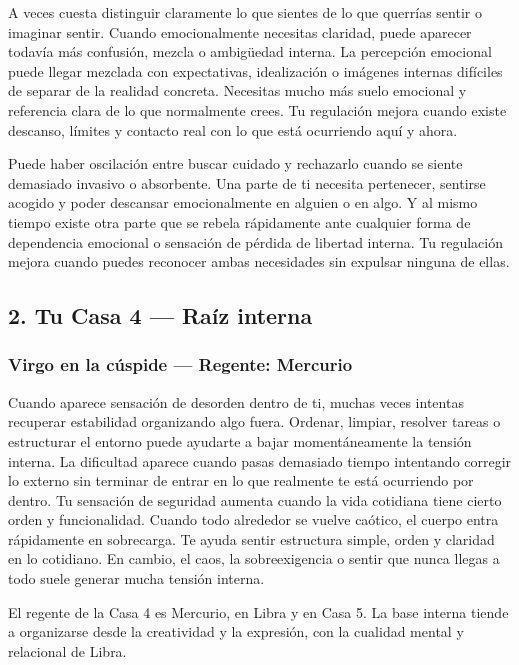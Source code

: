 \documentclass[11pt,a4paper]{article}
\begin{document}
A veces cuesta distinguir claramente lo que sientes de lo que querrías sentir o imaginar sentir. Cuando emocionalmente necesitas claridad, puede aparecer todavía más confusión, mezcla o ambigüedad interna. La percepción emocional puede llegar mezclada con expectativas, idealización o imágenes internas difíciles de separar de la realidad concreta. Necesitas mucho más suelo emocional y referencia clara de lo que normalmente crees. Tu regulación mejora cuando existe descanso, límites y contacto real con lo que está ocurriendo aquí y ahora.

Puede haber oscilación entre buscar cuidado y rechazarlo cuando se siente demasiado invasivo o absorbente. Una parte de ti necesita pertenecer, sentirse acogido y poder descansar emocionalmente en alguien o en algo. Y al mismo tiempo existe otra parte que se rebela rápidamente ante cualquier forma de dependencia emocional o sensación de pérdida de libertad interna. Tu regulación mejora cuando puedes reconocer ambas necesidades sin expulsar ninguna de ellas.

\vspace{0.8cm}

\subsection{2. Tu Casa 4 — Raíz interna}

\subsubsection*{Virgo en la cúspide — Regente: Mercurio}

Cuando aparece sensación de desorden dentro de ti, muchas veces intentas recuperar estabilidad organizando algo fuera. Ordenar, limpiar, resolver tareas o estructurar el entorno puede ayudarte a bajar momentáneamente la tensión interna. La dificultad aparece cuando pasas demasiado tiempo intentando corregir lo externo sin terminar de entrar en lo que realmente te está ocurriendo por dentro. Tu sensación de seguridad aumenta cuando la vida cotidiana tiene cierto orden y funcionalidad. Cuando todo alrededor se vuelve caótico, el cuerpo entra rápidamente en sobrecarga. Te ayuda sentir estructura simple, orden y claridad en lo cotidiano. En cambio, el caos, la sobreexigencia o sentir que nunca llegas a todo suele generar mucha tensión interna.

El regente de la Casa 4 es Mercurio, en Libra y en Casa 5. La base interna tiende a organizarse desde la creatividad y la expresión, con la cualidad mental y relacional de Libra.
\end{document}
